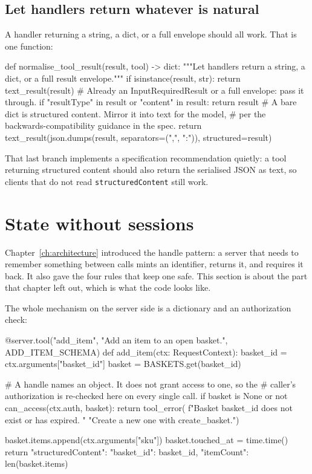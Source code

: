 \subsection{Let handlers return whatever is natural}

A handler returning a string, a dict, or a full envelope should all work. That is
one function:

\begin{py}
def normalise_tool_result(result, tool) -> dict:
    """Let handlers return a string, a dict, or a full result envelope."""
    if isinstance(result, str):
        return text_result(result)
    # Already an InputRequiredResult or a full envelope: pass it through.
    if "resultType" in result or "content" in result:
        return result
    # A bare dict is structured content. Mirror it into text for the model,
    # per the backwards-compatibility guidance in the spec.
    return text_result(json.dumps(result, separators=(",", ":")),
                       structured=result)
\end{py}

That last branch implements a specification recommendation quietly: a tool
returning structured content should also return the serialised JSON as text, so
clients that do not read \texttt{structuredContent} still work.

\section{State without sessions}

Chapter~\ref{ch:architecture} introduced the handle pattern: a server that needs
to remember something between calls mints an identifier, returns it, and requires
it back. It also gave the four rules that keep one safe. This section is about
the part that chapter left out, which is what the code looks like.

The whole mechanism on the server side is a dictionary and an authorization
check:

\begin{py}
@server.tool("add_item", "Add an item to an open basket.", ADD_ITEM_SCHEMA)
def add_item(ctx: RequestContext):
    basket_id = ctx.arguments["basket_id"]
    basket = BASKETS.get(basket_id)

    # A handle names an object. It does not grant access to one, so the
    # caller's authorization is re-checked here on every single call.
    if basket is None or not can_access(ctx.auth, basket):
        return tool_error(
            f"Basket {basket_id} does not exist or has expired. "
            "Create a new one with create_basket.")

    basket.items.append(ctx.arguments["sku"])
    basket.touched_at = time.time()
    return {"structuredContent": {"basket_id": basket_id,
                                  "itemCount": len(basket.items)}}
\end{py}

